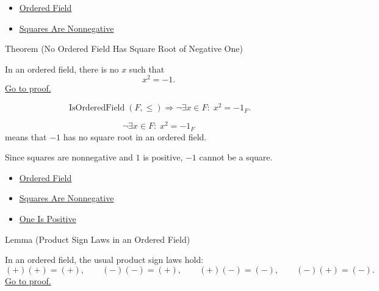 \begin{dependencies}
\begin{itemize}
  \item \hyperref[def:ordered-field]{Ordered Field}
  \item \hyperref[thm:ordered-field-squares-nonnegative]{Squares Are Nonnegative}
\end{itemize}
\end{dependencies}

\begin{theorembox}{Theorem (No Ordered Field Has Square Root of Negative One)}
\begin{theorem}\label{thm:ordered-field-no-square-root-negative-one}
In an ordered field, there is no $x$ such that
\[
x^2=-1.
\]
\hyperref[prf:ordered-field-no-square-root-negative-one]{Go to proof.}
\end{theorem}
\end{theorembox}

\begin{remark*}
\[
\operatorname{IsOrderedField}(F,\leq)
\Longrightarrow
\neg\exists x\in F{:}\; x^2=-1_F.
\]
\end{remark*}

\begin{remark*}
\[
\neg\exists x\in F{:}\; x^2=-1_F
\]
means that \(-1\) has no square root in an ordered field.
\end{remark*}

\begin{remark*}[Interpretation]
Since squares are nonnegative and \(1\) is positive, \(-1\) cannot be a square.
\end{remark*}

\begin{dependencies}
\begin{itemize}
  \item \hyperref[def:ordered-field]{Ordered Field}
  \item \hyperref[thm:ordered-field-squares-nonnegative]{Squares Are Nonnegative}
  \item \hyperref[thm:ordered-field-one-positive]{One Is Positive}
\end{itemize}
\end{dependencies}

\begin{lemmabox}{Lemma (Product Sign Laws in an Ordered Field)}
\begin{lemma}\label{lem:ordered-field-product-sign-laws}
In an ordered field, the usual product sign laws hold:
\[
(+)(+)=(+),\qquad (-)(-)=(+),\qquad (+)(-)=(-),\qquad (-)(+) = (-).
\]
\hyperref[prf:ordered-field-product-sign-laws]{Go to proof.}
\end{lemma}
\end{lemmabox}

